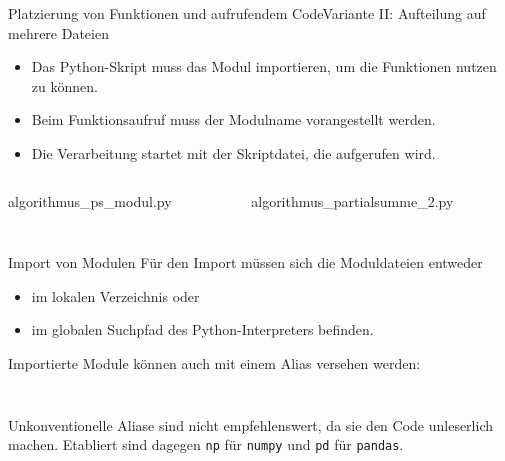 \documentclass[xelatex,aspectratio=169]{beamer}
\begin{document}
\begin{frame}{Platzierung von Funktionen und aufrufendem Code}{Variante II: Aufteilung auf mehrere Dateien}
  \begin{itemize}
    \item Das Python-Skript muss das Modul importieren, um die Funktionen nutzen zu können.
    \item Beim Funktionsaufruf muss der Modulname vorangestellt werden.
    \item Die Verarbeitung startet mit der Skriptdatei, die aufgerufen wird.
  \end{itemize}
  \vspace{-\baselineskip}
  \begin{columns}[t]
    \begin{column}{.5\linewidth}
      \begin{listing}
        \caption{algorithmus\_ps\_modul.py}
        \inputminted{python}{src/algorithmus_ps_modul.py}
      \end{listing}
    \end{column}
    \begin{column}{.5\linewidth}
      \begin{listing}
        \caption{algorithmus\_partialsumme\_2.py}
        \inputminted{python}{src/algorithmus_partialsumme_2.py}
      \end{listing}
    \end{column}
  \end{columns}
\end{frame}

\begin{frame}{Import von Modulen}
  Für den Import müssen sich die Moduldateien entweder
  \begin{itemize}
    \item im lokalen Verzeichnis oder
    \item im globalen Suchpfad des Python-Interpreters befinden.
  \end{itemize}

  Importierte Module können auch mit einem Alias versehen werden:

  \inputminted{python}{src/algorithmus_import_psm.py}
  \inputminted{python}{src/algorithmus_import_math.py}

  Unkonventionelle Aliase sind nicht empfehlenswert, da sie den Code unleserlich machen. Etabliert sind dagegen \texttt{np} für \texttt{numpy} und \texttt{pd} für \texttt{pandas}.
\end{frame}
\end{document}
